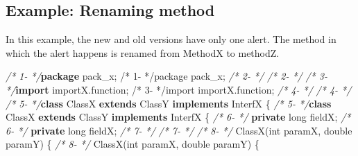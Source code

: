 \documentclass[
]{article}
\newenvironment{Shaded}{\begin{snugshade}}{\end{snugshade}}
\newcommand{\CommentTok}[1]{\textcolor[rgb]{0.56,0.35,0.01}{\textit{#1}}}
\newcommand{\DataTypeTok}[1]{\textcolor[rgb]{0.13,0.29,0.53}{#1}}
\newcommand{\FunctionTok}[1]{\textcolor[rgb]{0.00,0.00,0.00}{#1}}
\newcommand{\ImportTok}[1]{#1}
\newcommand{\KeywordTok}[1]{\textcolor[rgb]{0.13,0.29,0.53}{\textbf{#1}}}
\newcommand{\NormalTok}[1]{#1}
\begin{document}
\begin{landscape}

\subsection{Example: Renaming method} \label{example_rename_method}

In this example, the new and old versions have only one alert. The
method in which the alert happens is renamed from MethodX to methodZ.

\scriptsize

\begin{Shaded}
\begin{Highlighting}[]
\CommentTok{/*  1-                 */}\KeywordTok{package}\ImportTok{ pack_x;                                                /*  1-                 */package pack_x;}                                                
\CommentTok{/*  2-                 */}                                                               \CommentTok{/*  2-                 */}                                                               
\CommentTok{/*  3-                 */}\KeywordTok{import}\ImportTok{ importX.function;                                       /*  3-                 */import importX.function;}                                       
\CommentTok{/*  4-                 */}                                                               \CommentTok{/*  4-                 */}                                                               
\CommentTok{/*  5-                 */}\KeywordTok{class}\NormalTok{ ClassX }\KeywordTok{extends}\NormalTok{ ClassY }\KeywordTok{implements}\NormalTok{ InterfX \{               }\CommentTok{/*  5-                 */}\KeywordTok{class}\NormalTok{ ClassX }\KeywordTok{extends}\NormalTok{ ClassY }\KeywordTok{implements}\NormalTok{ InterfX \{               }
\CommentTok{/*  6-                 */}    \KeywordTok{private} \DataTypeTok{long}\NormalTok{ fieldX;                                       }\CommentTok{/*  6-                 */}    \KeywordTok{private} \DataTypeTok{long}\NormalTok{ fieldX;                                       }
\CommentTok{/*  7-                 */}                                                               \CommentTok{/*  7-                 */}                                                               
\CommentTok{/*  8-                 */}    \FunctionTok{ClassX}\NormalTok{(}\DataTypeTok{int}\NormalTok{ paramX, }\DataTypeTok{double}\NormalTok{ paramY) \{                                }\CommentTok{/*  8-                 */}    \FunctionTok{ClassX}\NormalTok{(}\DataTypeTok{int}\NormalTok{ paramX, }\DataTypeTok{double}\NormalTok{ paramY) \{                                }

\end{Highlighting}
\end{Shaded}
\end{landscape}
\end{document}
